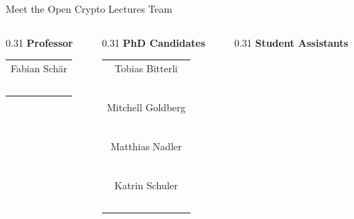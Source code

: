 \documentclass[handout]{beamer}
\begin{document}
\begin{frame}{Meet the Open Crypto Lectures Team}
	\begin{columns}[T]
		\begin{column}{0.31\textwidth}
			\center \textbf{Professor}
			\begin{table}\small
				\begin{tabular}{c}
					Fabian Schär\\
					\href{https://linkedin.com/in/fabian-schaer/}{\faLinkedinSquare}\ \href{https://twitter.com/fschaer}{\faTwitterSquare}\\
				\end{tabular}
			\end{table}
		\end{column}
		\begin{column}{0.31\textwidth}
			\center \textbf{PhD Candidates}
			\begin{table}\small
				\begin{tabular}{c}
					Tobias Bitterli\\
					\href{https://linkedin.com/in/tobiasbitterli/}{\faLinkedinSquare}\ \href{https://twitter.com/tobias_bitterli}{\faTwitterSquare}\\
					\vspace{0.5em}\\
					Mitchell Goldberg\\
					\href{https://linkedin.com/in/mitchell-goldberg/}{\faLinkedinSquare}\ \href{https://twitter.com/golmit_crypto}{\faTwitterSquare}\\
					\vspace{0.5em}\\
					Matthias Nadler\\
					\href{https://linkedin.com/in/mat-nadler/}{\faLinkedinSquare}\ \href{https://twitter.com/mat_nadler}{\faTwitterSquare}\\
					\vspace{0.5em}\\
					Katrin Schuler\\
					\href{https://linkedin.com/in/kmschuler/}{\faLinkedinSquare}\ \href{https://twitter.com/Katatcrypt}{\faTwitterSquare}\\
				\end{tabular}
			\end{table}
		\end{column}
		\begin{column}{0.31\textwidth}
			\center \textbf{Student Assistants}
			\begin{table}\small
				\begin{tabular}{c}

\end{tabular}
\end{table}
\end{column}
\end{columns}
\end{frame}
\end{document}
